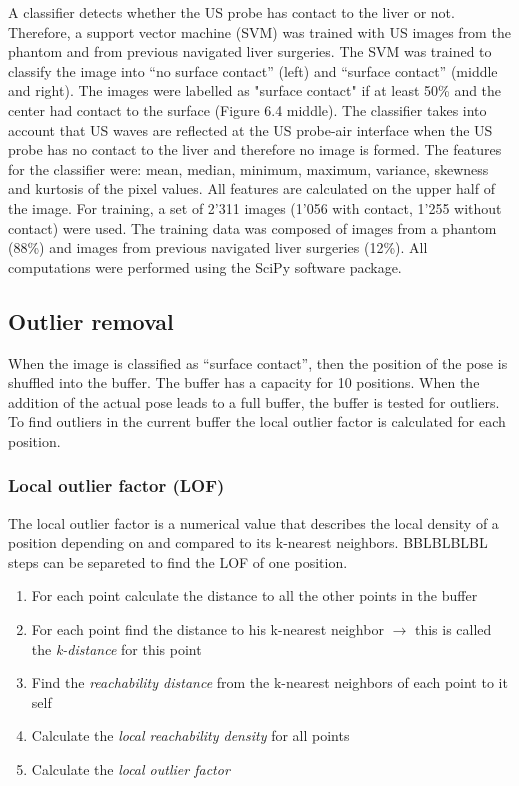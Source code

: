 A classifier detects whether the US probe has contact to the liver or not. Therefore, a support vector machine (SVM) was trained with US images
from the phantom and from previous navigated liver surgeries. The SVM was trained to
classify the image into ``no surface contact'' (left) and ``surface contact'' (middle and right).
The images were labelled as "surface contact" if at least 50\% and the center had contact
to the surface (Figure 6.4 middle). The classifier takes into account that US waves are
reflected at the US probe-air interface when the US probe has no contact to the liver and
therefore no image is formed. The features for the classifier were: mean, median, minimum,
maximum, variance, skewness and kurtosis of the pixel values. All features are calculated
on the upper half of the image. For training, a set of 2'311 images (1'056 with contact, 1'255
without contact) were used. The training data was composed of images from a phantom
(88\%) and images from previous navigated liver surgeries (12\%). All computations were
performed using the SciPy software package.
\subsection{Outlier removal}
When the image is classified as ``surface contact'', then the position of the pose is shuffled
into the buffer. The buffer has a capacity for 10 positions. When
the addition of the actual pose leads to a full buffer, the buffer is
tested for outliers. To find outliers in the current buffer the local
outlier factor is calculated for each position. 

\subsubsection{Local outlier factor (LOF)}
The local outlier factor is a numerical value that describes the local density
of a position depending on and compared to its k-nearest neighbors. BBLBLBLBL
steps can be separeted to find the LOF of one position.
\begin{enumerate}
  \item{For each point calculate the distance to all the other points in the buffer}
  \item{For each point find the distance to his k-nearest neighbor $\rightarrow$
    this is called the \textit{k-distance} for this point}
  \item{Find the \textit{reachability distance} from the k-nearest neighbors
      of each point to it self}
  \item{Calculate the \textit{local reachability density} for all points}
  \item{Calculate the \textit{local outlier factor}}
\end{enumerate}

